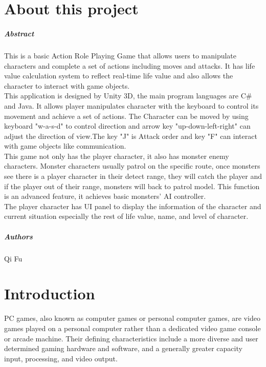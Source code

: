 
\chapter*{About this project}
\paragraph{Abstract}
This is a basic Action Role Playing Game that allows users to manipulate characters and complete a set of actions including moves and attacks. It has life value calculation system to reflect real-time life value and also allows the character to interact with game objects.\\
This application is designed by Unity 3D, the main program languages are C\# and Java. It allows player manipulates character with the keyboard to control its movement and achieve a set of actions. The Character can be moved by using keyboard "w-a-s-d" to control direction and arrow key "up-down-left-right" can adjust the direction of view.The key "J" is Attack order and key "F" can interact with game objects like communication.\\
This game not only has the player character, it also has monster enemy characters. Monster characters usually patrol on the specific route, once monsters see there is a player character in their detect range, they will catch the player and if the player out of their range, monsters will back to patrol model. This function is an advanced feature, it achieves basic monsters' AI controller.\\
The player character has UI panel to display the information of the character and current situation especially the rest of life value, name, and level of character.\\
\paragraph{Authors}
Qi Fu



\chapter{Introduction}
PC games, also known as computer games or personal computer games, are video games played on a personal computer rather than a dedicated video game console or arcade machine. Their defining characteristics include a more diverse and user determined gaming hardware and software, and a generally greater capacity input, processing, and video output.

